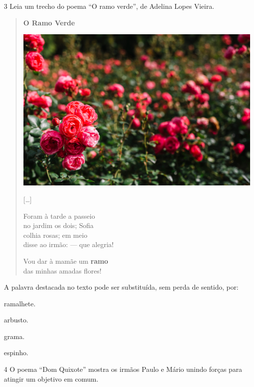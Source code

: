 \pagebreak
\num{3} Leia um trecho do poema ``O ramo verde'', de Adelina Lopes Vieira.

\begin{myquote}
\begin{verse}
\textbf{O Ramo Verde}

\includegraphics[width=.8\textwidth]{media/image39.jpg}

{[}\ldots{}{]}

Foram à tarde a passeio\\
no jardim os dois; Sofia\\
colhia rosas; em meio\\
disse ao irmão: --- que alegria!

Vou dar à mamãe um \textbf{ramo}\\
das minhas amadas flores!
\end{verse}

\end{myquote}

A palavra destacada no texto pode ser substituída, sem perda de sentido,
por:

\begin{escolha}
\item ramalhete.

\item arbusto.

\item grama.

\item espinho.
\end{escolha}


\pagebreak
\num{4} O poema ``Dom Quixote'' mostra os irmãos Paulo e Mário unindo
forças para atingir um objetivo em comum.

